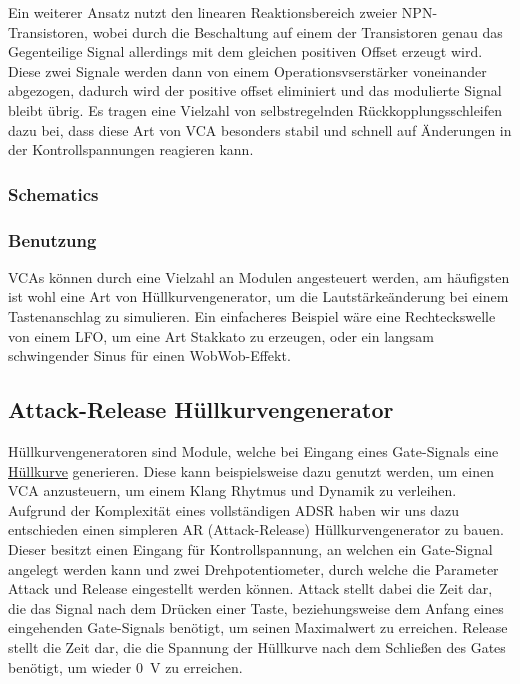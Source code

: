 Ein weiterer Ansatz nutzt den linearen Reaktionsbereich zweier NPN-Transistoren, wobei durch die Beschaltung auf einem der Transistoren genau das Gegenteilige Signal allerdings mit dem gleichen positiven Offset erzeugt wird. Diese zwei Signale werden dann von einem Operationsvserstärker voneinander abgezogen, dadurch wird der positive offset eliminiert und das modulierte Signal bleibt übrig. Es tragen eine Vielzahl von selbstregelnden Rückkopplungsschleifen dazu bei, dass diese Art von VCA besonders stabil und schnell auf Änderungen in der Kontrollspannungen reagieren kann.
\subsubsection{Schematics}
\label{sec:orgd012c94}
\subsubsection{Benutzung}
\label{sec:org3e7e4b4}
VCAs können durch eine Vielzahl an Modulen angesteuert werden, am häufigsten ist wohl eine Art von Hüllkurvengenerator, um die Lautstärkeänderung bei einem Tastenanschlag zu simulieren. Ein einfacheres Beispiel wäre eine Rechteckswelle von einem LFO, um eine Art Stakkato zu erzeugen, oder ein langsam schwingender Sinus für einen WobWob-Effekt.

\subsection{Attack-Release Hüllkurvengenerator}
\label{sec:org4b2d450}
Hüllkurvengeneratoren sind Module, welche bei Eingang eines Gate-Signals eine \href{file:///home/felixp/Documents/diplomarbeit/dokumentation/content/theoretische\_grundlagen.org}{Hüllkurve} generieren. Diese kann beispielsweise dazu genutzt werden, um einen VCA anzusteuern, um einem Klang Rhytmus und Dynamik zu verleihen. Aufgrund der Komplexität eines vollständigen ADSR haben wir uns dazu entschieden einen simpleren AR (Attack-Release) Hüllkurvengenerator zu bauen. Dieser besitzt einen Eingang für Kontrollspannung, an welchen ein Gate-Signal angelegt werden kann und zwei Drehpotentiometer, durch welche die Parameter Attack und Release eingestellt werden können. Attack stellt dabei die Zeit dar, die das Signal nach dem Drücken einer Taste, beziehungsweise dem Anfang eines eingehenden Gate-Signals benötigt, um seinen Maximalwert zu erreichen. Release stellt die Zeit dar, die die Spannung der Hüllkurve nach dem Schließen des Gates benötigt, um wieder \SI{0}{\volt} zu erreichen.


